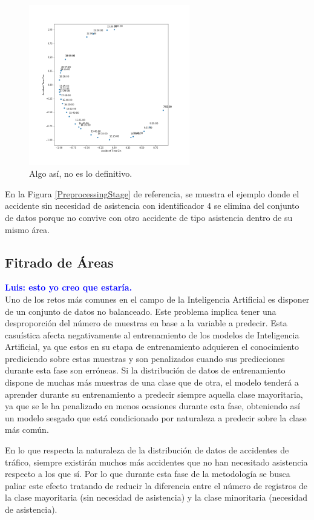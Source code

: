 \documentclass{uathesis-es}
\begin{document}
\begin{figure}[H]
    \centering
    \includegraphics[width=7cm]{Figures/hours.png}
    \caption{Algo así, no es lo definitivo.}
    \label{HoursPlot}
\end{figure}

En la Figura \ref{PreprocessingStage} de referencia, se muestra el ejemplo donde el accidente sin necesidad de asistencia con identificador 4 se elimina del conjunto de datos porque no convive con otro accidente de tipo asistencia dentro de su mismo área.

\subsection{Fitrado de Áreas}

\textcolor{blue}{\textbf{Luis: esto yo creo que estaría.}}\\

Uno de los retos más comunes en el campo de la Inteligencia Artificial es disponer de un conjunto de datos no balanceado. Este problema implica tener una desproporción del número de muestras en base a la variable a predecir. Esta casuística afecta negativamente al entrenamiento de los modelos de Inteligencia Artificial, ya que estos en su etapa de entrenamiento adquieren el conocimiento prediciendo sobre estas muestras y son penalizados cuando sus predicciones durante esta fase son erróneas. Si la distribución de datos de entrenamiento dispone de muchas más muestras de una clase que de otra, el modelo tenderá a aprender durante su entrenamiento a predecir siempre aquella clase mayoritaria, ya que se le ha penalizado en menos ocasiones durante esta fase, obteniendo así un modelo sesgado que está condicionado por naturaleza a predecir sobre la clase más común.

En lo que respecta la naturaleza de la distribución de datos de accidentes de tráfico, siempre existirán muchos más accidentes que no han necesitado asistencia respecto a los que sí. Por lo que durante esta fase de la metodología se busca paliar este efecto tratando de reducir la diferencia entre el número de registros de la clase mayoritaria (sin necesidad de asistencia) y la clase minoritaria (necesidad de asistencia).
\end{document}
